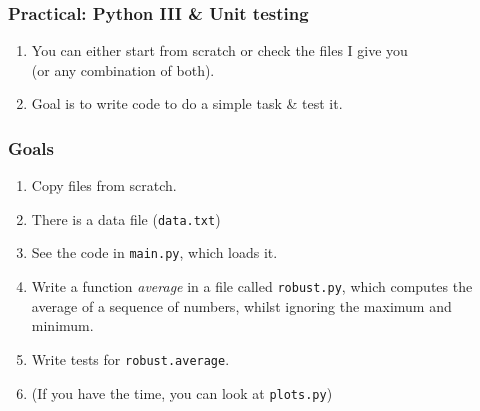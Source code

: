 \begin{frame}[fragile]
\frametitle{Practical: Python III \& Unit testing}

\begin{enumerate}
\item You can either start from scratch or check the files I give you\\
    (or any combination of both).
\item Goal is to write code to do a simple task \& test it.
\end{enumerate}

\end{frame}


\begin{frame}[fragile]
\frametitle{Goals}
\begin{enumerate}
\item Copy files from scratch.
\item There is a data file (\texttt{data.txt})
\item See the code in \texttt{main.py}, which loads it.
\item Write a function \emph{average} in a file called \texttt{robust.py}, which computes the average of a sequence of numbers, whilst ignoring the maximum and minimum.
\item Write tests for \texttt{robust.average}.
\item (If you have the time, you can look at \texttt{plots.py})
\end{enumerate}
\end{frame}


